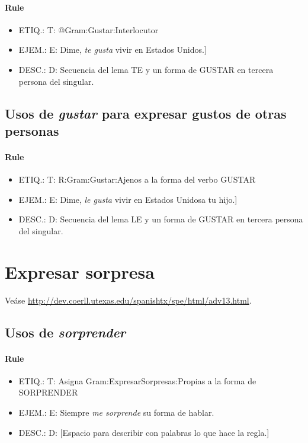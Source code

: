 \documentclass[11pt]{report}
\begin{document}
\paragraph*{Rule}
\begin{itemize}
\item ETIQ.:  T: @Gram:Gustar:Interlocutor
\item EJEM.:  E: Dime, \emph{te gusta} vivir en Estados Unidos.] 
\item DESC.:  D: Secuencia del lema TE y un forma de GUSTAR en tercera persona del singular.
\end{itemize}

\subsection{Usos de \emph{gustar} para expresar gustos de otras personas}
\paragraph*{Rule}
\begin{itemize}
\item ETIQ.:  T: R:Gram:Gustar:Ajenos a la forma del verbo GUSTAR
\item EJEM.:  E: Dime, \emph{le gusta} vivir en Estados Unidosa tu hijo.] 
\item DESC.:  D: Secuencia del lema LE y un forma de GUSTAR en tercera persona del singular.
\end{itemize}

\section{Expresar sorpresa}
Veáse \url{http://dev.coerll.utexas.edu/spanishtx/spe/html/adv13.html}.

\subsection{Usos de \emph{sorprender}}
\paragraph*{Rule}
\begin{itemize}
\item ETIQ.:  T: Asigna Gram:ExpresarSorpresas:Propias a la forma de SORPRENDER
\item EJEM.:  E: Siempre \emph{me sorprende} su forma de hablar.
\item DESC.:  D: [Espacio para describir con palabras lo que hace la regla.]
\end{itemize}
\end{document}
